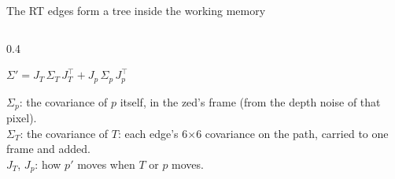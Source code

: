 \documentclass[10pt, aspectratio=169]{beamer}
\begin{document}
\begin{frame}{The RT edges form a tree inside the working memory}
\begin{columns}[c]
\begin{column}{0.4\textwidth}
    \centerline{$\Sigma' = J_T\,\Sigma_T\,J_T^\top + J_p\,\Sigma_p\,J_p^\top$}\vspace{0.3em}
    {\scriptsize
    $\Sigma_p$: the covariance of $p$ itself, in the zed's frame (from the depth noise of that pixel).\\[2pt]
    $\Sigma_T$: the covariance of $T$: each edge's 6$\times$6 covariance on the path, carried to one frame and added.\\[2pt]
    $J_T$, $J_p$: how $p'$ moves when $T$ or $p$ moves.\par}
  \end{column}
  \end{columns}
\end{frame}
\end{document}
